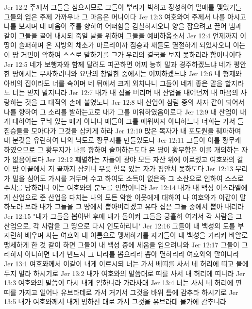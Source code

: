 Jer 12:2  주께서 그들을 심으시므로 그들이 뿌리가 박히고 장성하여 열매를 맺었거늘 그들의 입은 주께 가까우나 그 마음은 머니이다
Jer 12:3  여호와여 주께서 나를 아시고 나를 보시며 내 마음이 주를 향하여 어떠함을 감찰하시오니 양을 잡으려고 끌어 냄과 같이 그들을 끌어 내시되 죽일 날을 위하여 그들을 예비하옵소서
Jer 12:4  언제까지 이 땅이 슬퍼하며 온 지방의 채소가 마르리이까 짐승과 새들도 멸절하게 되었사오니 이는 이 땅 거민이 악하여 스스로 말하기를 그가 우리의 결국을 보지 못하리라 함이니이다
Jer 12:5  네가 보행자와 함께 달려도 피곤하면 어찌 능히 말과 경주하겠느냐 네가 평안한 땅에서는 무사하려니와 요단의 창일한 중에서는 어찌하겠느냐
Jer 12:6  네 형제와 아비의 집이라도 너를 속이며 네 뒤에서 크게 외치나니 그들이 네게 좋은 말을 할지라도 너는 믿지 말지니라
Jer 12:7  내가 내 집을 버리며 내 산업을 내어던져 내 마음의 사랑하는 것을 그 대적의 손에 붙였노니
Jer 12:8  내 산업이 삼림 중의 사자 같이 되어서 나를 향하여 그 소리를 발하는고로 내가 그를 미워하였음이로다
Jer 12:9  내 산업이 내게 대하여는 무늬 있는 매가 아니냐 매들이 그를 에워싸지 아니하느냐 너희는 가서 들짐승들을 모아다가 그것을 삼키게 하라
Jer 12:10  많은 목자가 내 포도원을 훼파하며 내 분깃을 유린하여 나의 낙토로 황무지를 만들었도다
Jer 12:11  그들이 이를 황무케 하였으므로 그 황무지가 나를 향하여 슬퍼하는도다 온 땅이 황무함은 이를 개의하는 자가 없음이로다
Jer 12:12  훼멸하는 자들이 광야 모든 자산 위에 이르렀고 여호와의 칼이 땅 이끝에서 저 끝까지 삼키니 무릇 혈육 있는 자가 평안치 못하도다
Jer 12:13  무리가 밀을 심어도 가시를 거두며 수고 하여도 소득이 없은즉 그 소산으로 인하여 스스로 수치를 당하리니 이는 여호와의 분노를 인함이니라
Jer 12:14  내가 내 백성 이스라엘에게 산업으로 준 산업을 다치는 나의 모든 악한 이웃에게 대하여 나 여호와가 이같이 말하노라 보라 내가 그들을 그 땅에서 뽑아버리겠고 유다 집은 그들 중에서 뽑아 내리라
Jer 12:15  "내가 그들을 뽑아낸 후에 내가 돌이켜 그들을 긍휼히 여겨서 각 사람을 그 산업으로, 각 사람을 그 땅으로 다시 인도하리니"
Jer 12:16  그들이 내 백성의 도를 부지런히 배우며 사는 여호와 내 이름으로 맹세하기를 자기들이 내 백성을 가리켜 바알로 맹세하게 한 것 같이 하면 그들이 내 백성 중에 세움을 입으려니와
Jer 12:17  그들이 그리하지 아니하면 내가 반드시 그 나라를 뽑으리라 뽑아 멸하리라 여호와의 말이니라
Jer 13:1  여호와께서 이같이 내게 이르시되 너는 가서 베띠를 사서 네 허리에 띠고 물에 두지 말라 하시기로
Jer 13:2  내가 여호와의 말씀대로 띠를 사서 내 허리에 띠니라
Jer 13:3  여호와의 말씀이 다시 내게 임하니라 가라사대
Jer 13:4  너는 사서 네 허리에 띤 띠를 가지고 일어나 유브라데로 가서 거기서 그것을 바위 틈에 감추라 하시기로
Jer 13:5  내가 여호와께서 내게 명하신 대로 가서 그것을 유브라데 물가에 감추니라
